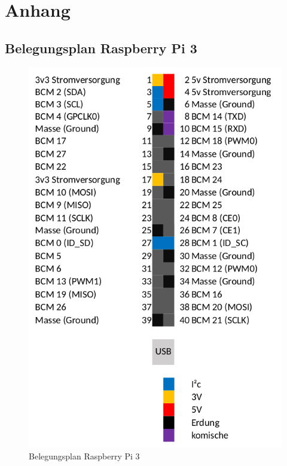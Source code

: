 \chapter{Anhang}
\section{Belegungsplan Raspberry Pi 3}
\label{Belegungsplan}
\begin{figure}[H]
\begin{center}
	\includegraphics[width=\textwidth,angle=0]{content/pictures/raspberrypins.png}
\end{center}
\caption{Belegungsplan Raspberry Pi 3}
\end{figure}
